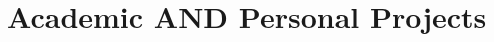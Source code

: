 \documentclass[11pt,a4paper]{moderncv}
\begin{document}
%
%
%

\section{Academic AND Personal Projects}
\end{document}

